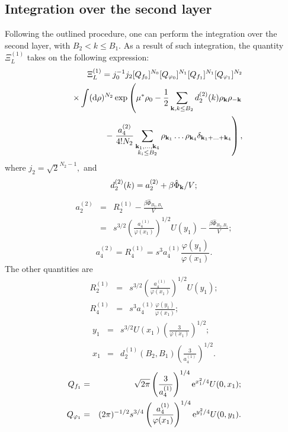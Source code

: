 \subsection{Integration over the second layer}
Following the outlined procedure, one can perform the integration over the second layer, with $B_2 < k \le B_1.$ As a result of such integration, the quantity $\Xi_L^{(1)}$ takes on the following expression:
\begin{eqnarray*}
	&&\Xi_L^{(1)} = j_0^{-1}j_2 [Q_{f_0}]^{N_0} [Q_{\varphi_0}]^{N_1} [Q_{f_1}]^{N_1} [Q_{\varphi_1}]^{N_2} 
	\\
	&& \times 
	\int ({\rm d} \rho)^{N_2} \exp
	\left(
	\mu^*\rho_0 - \frac{1}{2} \sum_{\vb k, k \leq B_2} d_2^{(2)}(k) \rho_{\vb k} \rho_{-\vb k}
	\right.
	\nonumber \\
	&& - 
	\left.
	\frac{a_4^{(2)}}{4!N_2} \sum_{\substack{\vb k_1, \dotsc, \vb k_4 \\ k_i \leq B_2}}
	\rho_{\vb k_1} \dotsc \rho_{\vb k_4} \delta_{\vb{k}_1 + \dotsc + \vb{k}_4}
	\right)
	\nonumber ,
\end{eqnarray*}
where $j_2 = \sqrt{2}^{N_2 - 1},$ and
\begin{equation}
	\label{RR_2_1_d}
	d_2^{(2)}(k) = a_2^{(2)} + \beta\hat{\Phi}_{\vb k} / V;
\end{equation}
\begin{eqnarray}
	\label{RR_2_1_a2}
	a_2^{(2)} & = & R_2^{(1)} - \frac{\beta\hat{\Phi}_{B_2, B_1}}{V} 
	\\
	& = & s^{3/2} \left(\frac{a_4^{(1)}}{\varphi(x_1)}\right)^{1/2} U(y_1)
	- \frac{\beta\hat{\Phi}_{B_2, B_1}}{V};
	\nonumber
\end{eqnarray}
\begin{equation}
	\label{RR_2_1_a4}
	a_4^{(2)} = R_4^{(1)} = s^3 a_4^{(1)} \frac{\varphi(y_1)}{\varphi(x_1)}.
\end{equation}
The other quantities are
\begin{eqnarray*}
	R_2^{(1)} & = & s^{3/2} \left(\frac{a_4^{(1)}}{\varphi(x_1)}\right)^{1/2} U(y_1); 
	\\
	R_4^{(1)} & = & s^3 a_4^{(1)} \frac{\varphi(y_1)}{\varphi(x_1)};
\end{eqnarray*}
\begin{eqnarray*}
	y_1 & = & s^{3/2} U(x_1) \left(\frac{3}{\varphi(x_1)}\right)^{1/2};
	\\
	x_1 & = & d_2^{(1)}(B_2, B_1) \left(\frac{3}{a_4^{(1)}}\right)^{1/2}.
\end{eqnarray*}
\begin{eqnarray*}
	Q_{f_1} & = & \sqrt{2\pi}\left(\frac{3}{a_4^{(1)}}\right)^{1/4} {\rm e}^{x_1^2/4} U(0,x_1);
\\
	Q_{\varphi_1} & = & (2\pi)^{-1/2} s^{3/4} \left(\frac{a_4^{(1)}}{\varphi(x_1)}\right)^{1/4} {\rm e}^{y_1^2/4} U(0,y_1).
\end{eqnarray*}

